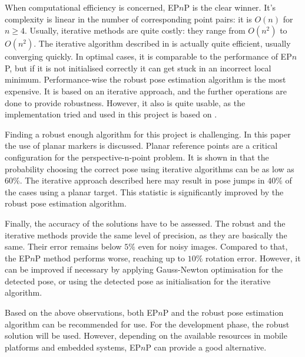 When computational efficiency is concerned, EP$n$P is the clear winner.
It's complexity is linear in the number of corresponding point pairs: it is $O(n)$ for $n\geq4$.
Usually, iterative methods are quite costly: they range from $O(n^2)$ to $O(n^2)$.
The iterative algorithm described in \cite{iterative} is actually quite efficient, usually converging quickly.
In optimal cases, it is comparable to the performance of EP$n$P, but if it is not initialised correctly it can get stuck in an incorrect local minimum.
Performance-wise the robust pose estimation algorithm is the most expensive.
It is based on an iterative approach, and the further operations are done to provide robustness.
However, it also is quite usable, as the implementation tried and used in this project is based on \cite{iterative}.

Finding a robust enough algorithm for this project is challenging.
In this paper the use of planar markers is discussed.
Planar reference points are a critical configuration for the perspective-n-point problem.
It is shown in \cite{robust} that the probability choosing the correct pose using iterative algorithms can be as low as $60\%$.
The iterative approach described here may result in pose jumps in $40\%$ of the cases using a planar target.
This statistic is significantly improved by the robust pose estimation algorithm.

Finally, the accuracy of the solutions have to be assessed.
The robust and the iterative methods provide the same level of precision, as they are basically the same.
Their error remains below $5\%$ even for noisy images.
Compared to that, the EP$n$P method performs worse, reaching up to $10\%$ rotation error.
However, it can be improved if necessary by applying Gauss-Newton optimisation for the detected pose, or using the detected pose as initialisation for the iterative algorithm.

Based on the above observations, both EP$n$P and the robust pose estimation algorithm can be recommended for use.
For the development phase, the robust solution will be used.
However, depending on the available resources in mobile platforms and embedded systems, EP$n$P can provide a good alternative.
